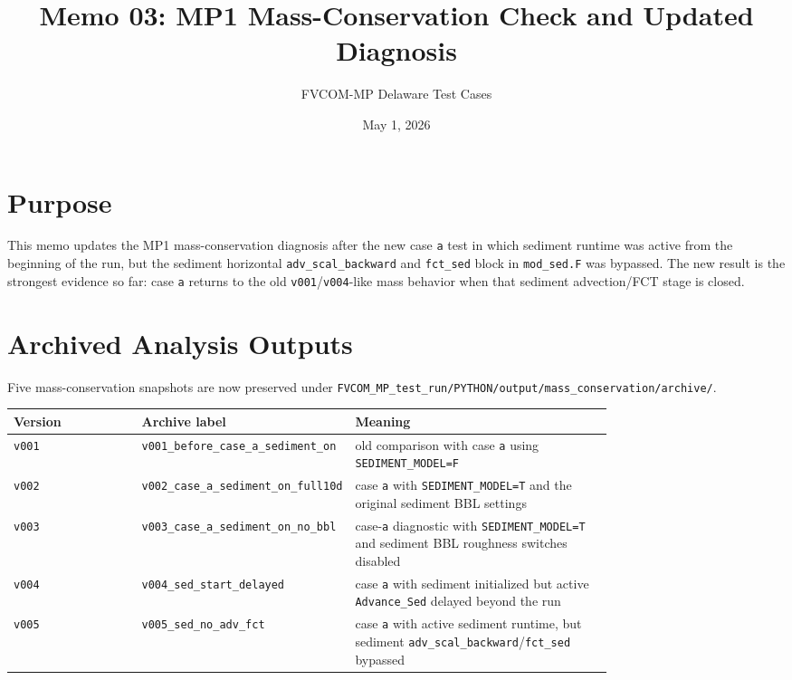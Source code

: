 \documentclass[11pt]{article}
\title{Memo 03: MP1 Mass-Conservation Check and Updated Diagnosis}
\author{FVCOM-MP Delaware Test Cases}
\date{May 1, 2026}
\begin{document}
\sloppy
\maketitle

\section*{Purpose}
This memo updates the MP1 mass-conservation diagnosis after the new case
\texttt{a} test in which sediment runtime was active from the beginning of the
run, but the sediment horizontal \texttt{adv\_scal\_backward} and
\texttt{fct\_sed} block in \texttt{mod\_sed.F} was bypassed.  The new result is
the strongest evidence so far: case \texttt{a} returns to the old
\texttt{v001}/\texttt{v004}-like mass behavior when that sediment advection/FCT
stage is closed.

\section*{Archived Analysis Outputs}
Five mass-conservation snapshots are now preserved under
\texttt{FVCOM\_MP\_test\_run/PYTHON/output/mass\_conservation/archive/}.

\begin{table}[h]
\centering
\small
\begin{tabular}{lp{0.34\linewidth}p{0.43\linewidth}}
\toprule
Version & Archive label & Meaning \\
\midrule
\texttt{v001} & \texttt{v001\_before\_case\_a\_sediment\_on} &
old comparison with case \texttt{a} using \texttt{SEDIMENT\_MODEL=F} \\
\texttt{v002} & \texttt{v002\_case\_a\_sediment\_on\_full10d} &
case \texttt{a} with \texttt{SEDIMENT\_MODEL=T} and the original sediment BBL
settings \\
\texttt{v003} & \texttt{v003\_case\_a\_sediment\_on\_no\_bbl} &
case-\texttt{a} diagnostic with \texttt{SEDIMENT\_MODEL=T} and sediment BBL
roughness switches disabled \\
\texttt{v004} & \texttt{v004\_sed\_start\_delayed} &
case \texttt{a} with sediment initialized but active \texttt{Advance\_Sed}
delayed beyond the run \\
\texttt{v005} & \texttt{v005\_sed\_no\_adv\_fct} &
case \texttt{a} with active sediment runtime, but sediment
\texttt{adv\_scal\_backward}/\texttt{fct\_sed} bypassed \\
\bottomrule
\end{tabular}
\end{table}
\end{document}
